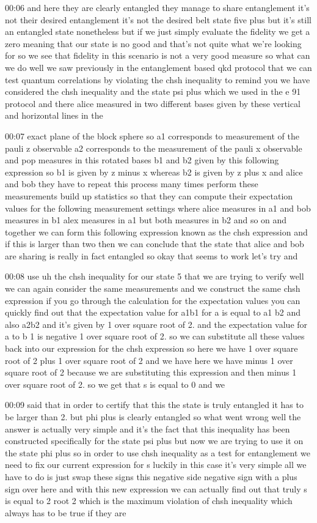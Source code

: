 00:06
and here they are clearly entangled they manage to share entanglement
it's not their desired entanglement it's not the desired belt state five plus
but it's still an entangled state nonetheless but if we just simply
evaluate the fidelity we get a zero meaning that our state is no good
and that's not quite what we're looking for so
we see that fidelity in this scenario is not a very good measure
so what can we do well we saw previously in the entanglement based qkd protocol
that we can test quantum correlations by violating the chsh inequality
to remind you we have considered the chsh inequality
and the state psi plus which we used in the e 91 protocol
and there alice measured in two different bases given
by these vertical and horizontal lines in the

00:07
exact plane of the block sphere so a1 corresponds to measurement of the pauli
z observable a2 corresponds to the measurement of the pauli x observable
and pop measures in this rotated bases b1 and b2 given by this following
expression so b1 is given by z minus x whereas b2 is given by z plus x
and alice and bob they have to repeat this process many times
perform these measurements build up statistics so that they can compute
their expectation values for the following measurement settings where
alice measures in a1 and bob measures in
b1 alex measures in a1 but both measures in b2
and so on and together we can form this following expression
known as the chsh expression and if this is larger than two then we
can conclude that the state that alice and bob
are sharing is really in fact entangled so okay that seems to work let's try and

00:08
use uh the chsh inequality for our state 5 that we are trying to verify
well we can again consider the same measurements and we construct the same chsh
expression if you go through the calculation for the expectation values
you can quickly find out that the expectation value for a1b1
for a is equal to a1 b2 and also a2b2 and it's given by 1 over square root of 2.
and the expectation value for a to b 1 is
negative 1 over square root of 2. so we can substitute
all these values back into our expression for the chsh expression
so here we have 1 over square root of 2 plus
1 over square root of 2 and we have here we have
minus 1 over square root of 2 because we are substituting this expression
and then minus 1 over square root of 2. so we get that s is equal to 0 and we

00:09
said that in order to certify that this the state is truly entangled it has to
be larger than 2. but phi plus is clearly entangled so
what went wrong well the answer is actually very simple
and it's the fact that this inequality has been constructed specifically for
the state psi plus but now we are trying to use it on the state phi plus so
in order to use chsh inequality as a test for entanglement we need to fix our
current expression for s luckily in this case it's very simple
all we have to do is just swap these signs this negative side negative sign
with a plus sign over here and with this new expression
we can actually find out that truly s is equal to 2 root 2 which is the
maximum violation of chsh inequality which always has to be true if they are

